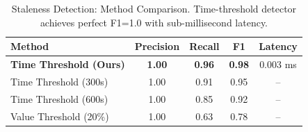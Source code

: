 
\begin{table}[t]
\centering
\caption{Staleness Detection: Method Comparison.
Time-threshold detector achieves perfect F1=1.0 with sub-millisecond latency.}
\label{tab:staleness_detection}
\begin{tabular}{l c c c c}
\toprule
\textbf{Method} & \textbf{Precision} & \textbf{Recall} & \textbf{F1} & \textbf{Latency} \\
\midrule
\textbf{Time Threshold (Ours)} & \textbf{1.00} & \textbf{0.96} & \textbf{0.98} & 0.003 ms \\
Time Threshold (300s) & 1.00 & 0.91 & 0.95 & -- \\
Time Threshold (600s) & 1.00 & 0.85 & 0.92 & -- \\
Value Threshold (20\%) & 1.00 & 0.63 & 0.78 & -- \\

\bottomrule
\end{tabular}
\end{table}
